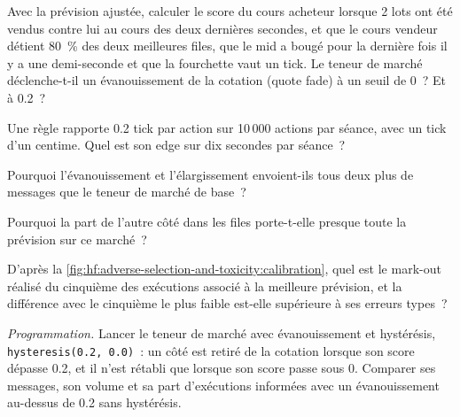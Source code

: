 \begin{exercise}[$\star$]\label{exo:hf:adverse-selection-and-toxicity:2}
Avec la prévision ajustée, calculer le score du cours acheteur lorsque 2 lots ont été vendus contre lui au cours des deux dernières secondes, et que le cours vendeur détient 80~\% des deux meilleures
files, que le mid a bougé pour la dernière fois il y a une demi-seconde et que la fourchette vaut un tick. Le teneur de marché déclenche-t-il un évanouissement de la cotation (quote fade) à un seuil de 0~? Et à 0.2~?
\end{exercise}

\begin{exercise}[$\star$]\label{exo:hf:adverse-selection-and-toxicity:3}
Une règle rapporte 0.2 tick par action sur 10\,000 actions par séance, avec un tick d'un centime. Quel est son edge sur dix secondes par séance~?
\end{exercise}

\begin{exercise}[$\star\star$]\label{exo:hf:adverse-selection-and-toxicity:4}
Pourquoi l'évanouissement et l'élargissement envoient-ils tous deux plus de messages que le teneur de marché de base~?
\end{exercise}

\begin{exercise}[$\star\star$]\label{exo:hf:adverse-selection-and-toxicity:5}
Pourquoi la part de l'autre côté dans les files porte-t-elle presque toute la prévision sur ce marché~?
\end{exercise}

\begin{exercise}[$\star\star$]\label{exo:hf:adverse-selection-and-toxicity:6}
D'après la \cref{fig:hf:adverse-selection-and-toxicity:calibration}, quel est le mark-out réalisé du cinquième des exécutions associé à la meilleure prévision, et
la différence avec le cinquième le plus faible est-elle supérieure à ses erreurs types~?
\end{exercise}

\begin{exercise}[$\star\star\star$]\label{exo:hf:adverse-selection-and-toxicity:7}
\emph{Programmation.} Lancer le teneur de marché avec évanouissement et hystérésis, \texttt{hysteresis(0.2, 0.0)}~: un côté est retiré de la cotation lorsque son score dépasse 0.2, et il n'est rétabli que
lorsque son score passe sous 0. Comparer ses messages, son volume et sa part d'exécutions informées avec un évanouissement au-dessus de 0.2 sans hystérésis.
\end{exercise}


